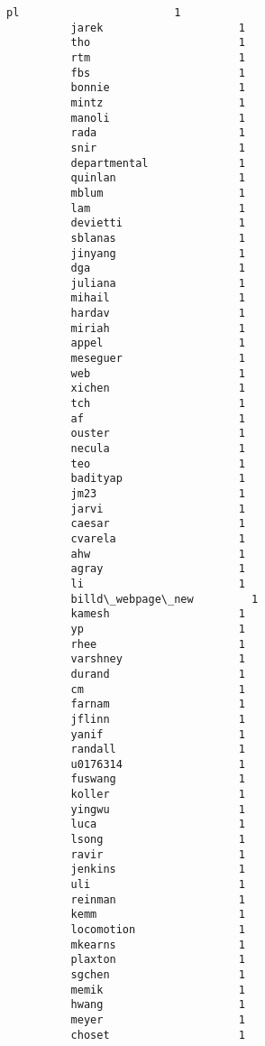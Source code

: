 \documentclass[11pt]{article}
\begin{document}
\begin{Verbatim}[commandchars=\\\{\}]
          pl                        1
          jarek                     1
          tho                       1
          rtm                       1
          fbs                       1
          bonnie                    1
          mintz                     1
          manoli                    1
          rada                      1
          snir                      1
          departmental              1
          quinlan                   1
          mblum                     1
          lam                       1
          devietti                  1
          sblanas                   1
          jinyang                   1
          dga                       1
          juliana                   1
          mihail                    1
          hardav                    1
          miriah                    1
          appel                     1
          meseguer                  1
          web                       1
          xichen                    1
          tch                       1
          af                        1
          ouster                    1
          necula                    1
          teo                       1
          badityap                  1
          jm23                      1
          jarvi                     1
          caesar                    1
          cvarela                   1
          ahw                       1
          agray                     1
          li                        1
          billd\_webpage\_new         1
          kamesh                    1
          yp                        1
          rhee                      1
          varshney                  1
          durand                    1
          cm                        1
          farnam                    1
          jflinn                    1
          yanif                     1
          randall                   1
          u0176314                  1
          fuswang                   1
          koller                    1
          yingwu                    1
          luca                      1
          lsong                     1
          ravir                     1
          jenkins                   1
          uli                       1
          reinman                   1
          kemm                      1
          locomotion                1
          mkearns                   1
          plaxton                   1
          sgchen                    1
          memik                     1
          hwang                     1
          meyer                     1
          choset                    1

\end{Verbatim}
\end{document}
